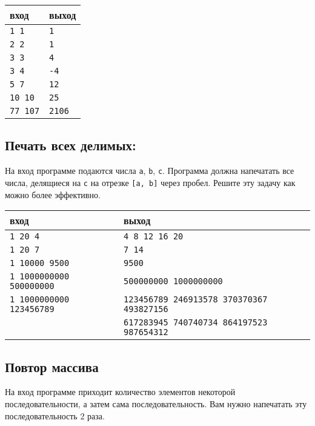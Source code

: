 \documentclass[10pt]{article}
\begin{document}
\begin{center}
\begin{tabular}{ l l }
 вход & выход \\ \hline
 \texttt{1 1}  & \texttt{1}  \\ 
 \texttt{2 2} & \texttt{1}  \\ 
 \texttt{3 3} & \texttt{4}  \\ 
 \texttt{3 4} & \texttt{-4}  \\  
 \texttt{5 7} & \texttt{12}  \\  
 \texttt{10 10} & \texttt{25}  \\  
 \texttt{77 107} & \texttt{2106}  \\ 
\end{tabular}
\end{center}


\subsection{Печать всех делимых:}
На вход программе подаются числа \texttt{a}, \texttt{b}, \texttt{c}. Программа должна напечатать все числа, делящиеся на \texttt{c} на отрезке \texttt{[a, b]} через пробел. Решите эту задачу как можно более эффективно.

\begin{center}
\begin{tabular}{ l l }
 вход & выход \\ \hline
 \texttt{1 20 4}  & \texttt{4 8 12 16 20}  \\ 
 \texttt{1 20 7} &  \texttt{7 14}  \\ 
 \texttt{1 10000 9500} & \texttt{9500}  \\ 
 \texttt{1 1000000000 500000000} & \texttt{500000000 1000000000} \\
 \texttt{1 1000000000 123456789} & \texttt{123456789 246913578 370370367 493827156}  \\ 
                                 & \texttt{617283945 740740734 864197523 987654312}  \\   
\end{tabular}
\end{center}


\subsection{Повтор массива}
На вход программе приходит количество элементов некоторой последовательности, а затем сама последовательность. Вам нужно напечатать эту последовательность 2 раза.
\end{document}
